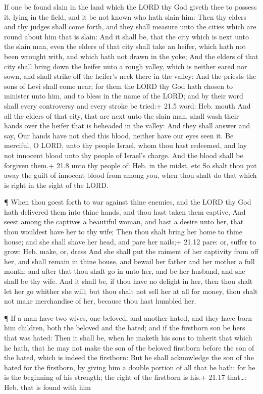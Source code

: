  If one be found slain in the land which the LORD thy God
giveth thee to possess it, lying in the field, and it be not known who
hath slain him:  Then thy elders and thy judges shall come
forth, and they shall measure unto the cities which are round about him
that is slain:  And it shall be, that the city which is next
unto the slain man, even the elders of that city shall take an heifer,
which hath not been wrought with, and which hath not drawn in the yoke;
 And the elders of that city shall bring down the heifer
unto a rough valley, which is neither eared nor sown, and shall strike
off the heifer's neck there in the valley:  And the priests
the sons of Levi shall come near; for them the LORD thy God hath chosen
to minister unto him, and to bless in the name of the LORD; and by their
word shall every controversy and every stroke be tried:+ 21.5 word: Heb.
mouth  And all the elders of that city, that are next unto
the slain man, shall wash their hands over the heifer that is beheaded
in the valley:  And they shall answer and say, Our hands
have not shed this blood, neither have our eyes seen it.  Be
merciful, O LORD, unto thy people Israel, whom thou hast redeemed, and
lay not innocent blood unto thy people of Israel's charge. And the blood
shall be forgiven them.+ 21.8 unto thy people of: Heb. in the midst, etc
 So shalt thou put away the guilt of innocent blood from
among you, when thou shalt do that which is right in the sight of the
LORD.

 ¶ When thou goest forth to war against thine enemies, and
the LORD thy God hath delivered them into thine hands, and thou hast
taken them captive,  And seest among the captives a
beautiful woman, and hast a desire unto her, that thou wouldest have her
to thy wife;  Then thou shalt bring her home to thine
house; and she shall shave her head, and pare her nails;+ 21.12 pare:
or, suffer to grow: Heb. make, or, dress  And she shall put
the raiment of her captivity from off her, and shall remain in thine
house, and bewail her father and her mother a full month: and after that
thou shalt go in unto her, and be her husband, and she shall be thy
wife.  And it shall be, if thou have no delight in her,
then thou shalt let her go whither she will; but thou shalt not sell her
at all for money, thou shalt not make merchandise of her, because thou
hast humbled her.

 ¶ If a man have two wives, one beloved, and another hated,
and they have born him children, both the beloved and the hated; and if
the firstborn son be hers that was hated:  Then it shall
be, when he maketh his sons to inherit that which he hath, that he may
not make the son of the beloved firstborn before the son of the hated,
which is indeed the firstborn:  But he shall acknowledge
the son of the hated for the firstborn, by giving him a double portion
of all that he hath: for he is the beginning of his strength; the right
of the firstborn is his.+ 21.17 that\ldots: Heb. that is found with him

